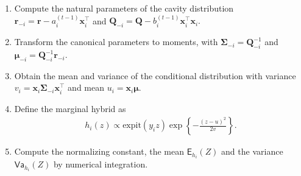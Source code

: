 \documentclass[
  11pt,
  letterpaper,
]{scrbook}
\providecommand{\tightlist}{%
  \setlength{\itemsep}{0pt}\setlength{\parskip}{0pt}}
\theoremstyle{definition}
\theoremstyle{plain}
\theoremstyle{plain}
\theoremstyle{plain}
\theoremstyle{definition}
\theoremstyle{definition}
\theoremstyle{plain}
\theoremstyle{plain}
\theoremstyle{remark}
\begin{document}
\begin{enumerate}
\def\labelenumi{\arabic{enumi}.}
\tightlist
\item
  Compute the natural parameters of the cavity distribution
  \(\boldsymbol{r}_{-i} = \boldsymbol{r} - a_i^{(t-1)}\mathbf{x}_i^\top\)
  and
  \(\mathbf{Q}_{-i} = \mathbf{Q} - b_i^{(t-1)}\mathbf{x}_i^\top\mathbf{x}_i.\)
\item
  Transform the canonical parameters to moments, with
  \(\boldsymbol{\Sigma}_{-i} = \mathbf{Q}_{-i}^{-1}\) and
  \(\boldsymbol{\mu}_{-i} = \mathbf{Q}_{-i}^{-1}\boldsymbol{r}_{-i}\).
\item
  Obtain the mean and variance of the conditional distribution with
  variance
  \(v_i = \mathbf{x}_i\boldsymbol{\Sigma}_{-i}\mathbf{x}_i^\top\) and
  mean \(u_i=\mathbf{x}_i\boldsymbol{\mu}.\)
\item
  Define the marginal hybrid as \begin{align*}
  h_i(z) \propto \mathrm{expit}(y_iz) \exp\left\{-\frac{(z-u)^2}{2v}\right\}.
  \end{align*}
\item
  Compute the normalizing constant, the mean \(\mathsf{E}_{h_i}(Z)\) and
  the variance \(\mathsf{Va}_{h_i}(Z)\) by numerical integration.
\end{enumerate}
\end{document}

